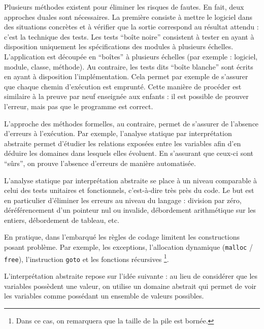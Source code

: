 Plusieurs méthodes existent pour éliminer les risques de fautes. En fait, deux
approches duales sont nécessaires. La première consiste à mettre le logiciel
dans des situations concrètes et à vérifier que la sortie correspond au résultat
attendu : c'est la technique des tests.  Les tests \enquote{boîte noire}
consistent à tester en ayant à disposition uniquement les spécifications des
modules à plusieurs échelles. L'application est découpée en \enquote{boîtes} à
plusieurs échelles (par exemple : logiciel, module, classe, méthode). Au
contraire, les tests dits \enquote{boîte blanche} sont écrits en ayant à
disposition l'implémentation. Cela permet par exemple de s'assurer que chaque
chemin d'exécution est emprunté. Cette manière de procéder est similaire à la
preuve par neuf enseignée aux enfants : il est possible de prouver l'erreur,
mais pas que le programme est correct.

L'approche des méthodes formelles, au contraire, permet de s'assurer de
l'absence d'erreurs à l'exécution. Par exemple, l'analyse statique par
interprétation abstraite permet d'étudier les relations exposées entre les
variables afin d'en déduire les domaines dans lesquels elles évoluent. En
s'assurant que ceux-ci sont \enquote{sûrs}, on prouve l'absence d'erreurs de
manière automatisée.

L'analyse statique par interprétation abstraite se place à un niveau comparable
à celui des tests unitaires et fonctionnels, c'est-à-dire très près du code. Le
but est en particulier d'éliminer les erreurs au niveau du langage : division
par zéro, déréférencement d'un pointeur nul ou invalide, débordement
arithmétique sur les entiers, débordement de tableau, etc.

En pratique, dans l'embarqué les règles de codage limitent les constructions
posant problème. Par exemple, les exceptions, l'allocation dynamique
(\texttt{malloc} / \texttt{free}), l'instruction \texttt{goto} et les fonctions
récursives \footnote{Dans ce cas, on remarquera que la taille de la pile est
bornée.}.

L'interprétation abstraite repose sur l'idée suivante : au lieu de considérer
que les variables possèdent une valeur, on utilise un domaine abstrait qui
permet de voir les variables comme possédant un ensemble de valeurs possibles.

